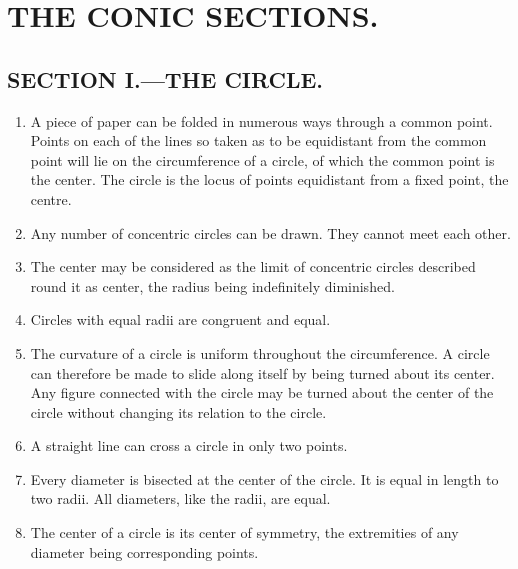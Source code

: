 
\chapter{THE CONIC SECTIONS.}


\section{SECTION I.—THE CIRCLE.}


\begin{enumerate}


\item A piece of paper can be folded in numerous ways through a common point.
        Points on each of the lines so taken as to be equidistant from the
        common point will lie on the circumference of a circle, of which the
        common point is the center. The circle is the locus of points
        equidistant from a fixed point, the centre.


\item Any number of concentric circles can be drawn. They cannot meet each
    other.


\item The center may be considered as the limit of concentric circles described
    round it as center, the radius being indefinitely diminished.


\item Circles with equal radii are congruent and equal.


\item The curvature of a circle is uniform throughout the circumference. A
    circle can therefore be made to slide along itself by being turned about its
    center.  Any figure connected with the circle may be turned about the center 
    of the circle without changing its relation to the circle.

\item A straight line can cross a circle in only two points.

\item Every diameter is bisected at the center of the circle. It is equal in
    length to two radii. All diameters, like the radii, are equal.


\item The center of a circle is its center of symmetry, the extremities of any
    diameter being corresponding points.



\end{enumerate}
